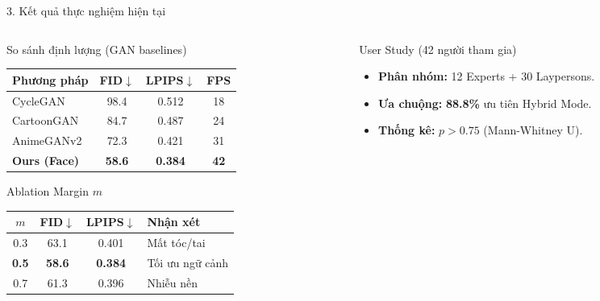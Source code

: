 \documentclass[aspectratio=169,11pt]{beamer}
\begin{document}
\begin{frame}{3. Kết quả thực nghiệm hiện tại}
\vspace*{-0.15cm}

\begin{columns}[T]
\begin{column}{0.48\textwidth}
\small

\begin{block}{So sánh định lượng (GAN baselines)}
\centering
\scriptsize
\begin{tabular}{lccc}
\toprule
\textbf{Phương pháp} & \textbf{FID}$\downarrow$ & \textbf{LPIPS}$\downarrow$ & \textbf{FPS} \\
\midrule
CycleGAN      & 98.4 & 0.512 & 18 \\
CartoonGAN    & 84.7 & 0.487 & 24 \\
AnimeGANv2    & 72.3 & 0.421 & 31 \\
\midrule
\textbf{Ours (Face)}  & \textbf{58.6} & \textbf{0.384} & \textbf{42} \\
\bottomrule
\end{tabular}
\end{block}

\vspace*{-0.1cm}
\begin{block}{Ablation Margin $m$}
\centering
\scriptsize
\begin{tabular}{cccp{2.2cm}}
\toprule
$m$ & FID$\downarrow$ & LPIPS$\downarrow$ & Nhận xét \\
\midrule
0.3 & 63.1 & 0.401 & Mất tóc/tai \\
\textbf{0.5} & \textbf{58.6} & \textbf{0.384} & Tối ưu ngữ cảnh \\
0.7 & 61.3 & 0.396 & Nhiễu nền \\
\bottomrule
\end{tabular}
\end{block}

\end{column}
\begin{column}{0.49\textwidth}
\small

\begin{block}{User Study (42 người tham gia)}
\begin{itemize}\itemsep=1pt
    \item \textbf{Phân nhóm:} 12 Experts + 30 Laypersons.
    \item \textbf{Ưa chuộng:} \textbf{88.8\%} ưu tiên Hybrid Mode.
    \item \textbf{Thống kê:} $p > 0.75$ (Mann-Whitney U).
\end{itemize}
\end{block}


\end{column}
\end{columns}
\end{frame}
\end{document}
